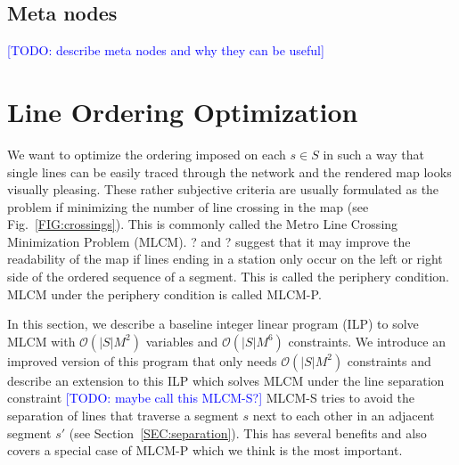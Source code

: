 \documentclass{llncs}
\newcommand\todo[1]{\textcolor{blue}{[TODO: #1]}}
\begin{document}
%
\subsection{Meta nodes}\label{SEC:metanodes}
%
\todo{describe meta nodes and why they can be useful}

%
\section{Line Ordering Optimization}\label{SEC:ordering}
%
We want to optimize the ordering imposed on each $s \in S$ in such a way that single lines can be easily traced through the network and the rendered map looks visually pleasing. These rather subjective criteria are usually formulated as the problem if minimizing the number of line crossing in the map (see Fig.~\ref{FIG:crossings}). This is commonly called the Metro Line Crossing Minimization Problem (MLCM). ? and ? suggest that it may improve the readability of the map if lines ending in a station only occur on the left or right side of the ordered sequence of a segment. This is called the periphery condition. MLCM under the periphery condition is called MLCM-P.

In this section, we describe a baseline integer linear program (ILP) to solve MLCM with $\mathcal{O}(|S|M^{2})$ variables and $\mathcal{O}(|S|M^{6})$ constraints.
We introduce an improved version of this program that only needs $\mathcal{O}(|S|M^2)$ constraints and describe an extension to this ILP which solves MLCM under the line separation constraint \todo{maybe call this MLCM-S?}
MLCM-S tries to avoid the separation of lines that traverse a segment $s$ next to each other in an adjacent segment $s'$ (see Section~\ref{SEC:separation}).
This has several benefits and also covers a special case of MLCM-P which we think is the most important.

%
\end{document}
